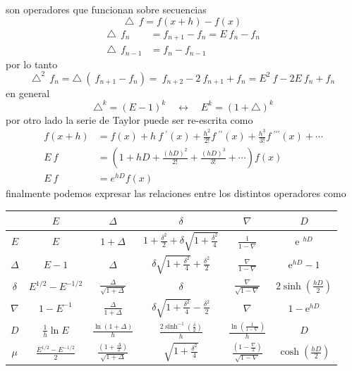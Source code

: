 \documentclass[spanish,titlepage,11pt]{article}
\begin{document}
son operadores que funcionan sobre secuencias
\[
\triangle\ \ f=f(x+h)-f(x)
\]
\begin{align*}
\triangle\ \ f_{n}  &  =f_{n+1}-f_{n}=E\ f_{n}-f_{n}\\
\triangle\ \ f_{n-1}  &  =f_{n}-f_{n-1}%
\end{align*}
por lo tanto
\[
\triangle^{2}\ \ f_{n}=\triangle\ \left(  \ f_{n+1}-f_{n}\right)
=\ f_{n+2}-2\ f_{n+1}+f_{n}=E^{2}\ f-2E\ f_{n}+f_{n}
\]
en general
\[
\triangle^{k}=\left(  E-1\right)  ^{k}\quad\longleftrightarrow\quad
E^{k}=\left(  1+\triangle\right)  ^{k}
\]
por otro lado la serie de Taylor puede ser re-escrita como
\begin{align*}
f(x+h)  &  =f(x)+h\ f\ ^{\prime}(x)+\frac{h^{2}}{2!}f\ ^{\prime\prime
}(x)+\frac{h^{3}}{3!}f\ ^{\prime\prime\prime}(x)+\cdots\\
E\ f  &  =\left(  1+hD+\frac{\left(  hD\right)  ^{2}}{2!}+\frac{\left(
hD\right)  ^{3}}{3!}+\cdots\right)  f(x)\\
E\ f  &  =e^{hD}f(x)
\end{align*}
finalmente podemos expresar las relaciones entre los distintos operadores como%

\begin{tabular}
[c]{l|ccccc}\hline
& $E$ & $\Delta$ & $\delta$ & $\nabla$ & $D$\\\hline\hline
\multicolumn{1}{c|}{$E$} & $E$ & $1+\Delta$ & $1+\frac{\delta^{2}}{2}%
+\delta\sqrt{1+\frac{\delta^{2}}{4}}$ & $\frac{1}{1-\nabla}$ & \textrm{e}%
$^{hD}$\\\hline
\multicolumn{1}{c|}{$\Delta$} & $E-1$ & $\Delta$ & $\delta\sqrt{1+\frac
{\delta^{2}}{4}}+\frac{\delta^{2}}{2}$ & $\frac{\nabla}{1-\nabla}$ &
\textrm{e}$^{hD}-1$\\\hline
\multicolumn{1}{c|}{$\delta$} & $E^{1/2}-E^{-1/2}$ & $\frac{\Delta}%
{\sqrt{1+\Delta}}$ & $\delta$ & $\frac{\nabla}{\sqrt{1-\nabla}}$ &
$2\sinh\left(  \frac{hD}{2}\right)  $\\\hline
\multicolumn{1}{c|}{$\nabla$} & $1-E^{-1}$ & $\frac{\Delta}{1+\Delta}$ &
$\delta\sqrt{1+\frac{\delta^{2}}{4}}-\frac{\delta^{2}}{2}$ & $\nabla$ &
$1-$\textrm{e}$^{hD}$\\\hline
\multicolumn{1}{c|}{$D$} & $\frac{1}{h}\ln E$ & $\frac{\ln\left(
1+\Delta\right)  }{h}$ & $\frac{2\sinh^{-1}\left(  \frac{\delta}{2}\right)
}{h}$ & $\frac{\ln\left(  \frac{1}{1-\nabla}\right)  }{h}$ & $D$\\\hline
\multicolumn{1}{c|}{$\mu$} & $\frac{E^{1/2}-E^{-1/2}}{2}$ & $\frac{\left(
1+\frac{\Delta}{2}\right)  }{\sqrt{1+\Delta}}$ & $\sqrt{1+\frac{\delta^{2}}%
{4}}$ & $\frac{\left(  1-\frac{\nabla}{2}\right)  }{\sqrt{1-\nabla}}$ &
$\cosh\left(  \frac{hD}{2}\right)  $%
\end{tabular}
\end{document}
